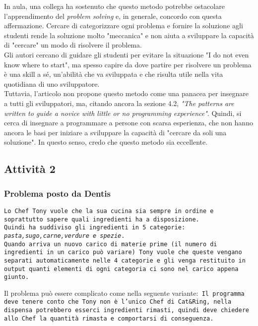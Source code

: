 \documentclass[a4paper]{article}
\begin{document}
In aula, una collega ha sostenuto che questo metodo potrebbe ostacolare l'apprendimento del \textit{problem solving} e, in generale, concordo con questa affermazione.
Cercare di categorizzare ogni problema e fornire la soluzione agli studenti rende la soluzione molto "meccanica" e non aiuta a sviluppare la capacità di "cercare" un modo di risolvere il problema.\\
Gli autori cercano di guidare gli studenti per evitare la situazione "I do not even know where to start", ma spesso capire da dove partire per risolvere un problema è una skill a sé, un'abilità che va sviluppata e che risulta utile nella vita quotidiana di uno sviluppatore.\\

Tuttavia, l'articolo non propone questo metodo come una panacea per insegnare a tutti gli sviluppatori, ma, citando ancora la sezione 4.2, \textit{"The patterns are written to guide a novice with little or no programming experience"}.
Quindi, si cerca di insegnare a programmare a persone con scarsa esperienza, che non hanno ancora le basi per iniziare a sviluppare la capacità di "cercare da soli una soluzione". In questo senso, credo che questo metodo sia eccellente.

\subsection{Attività 2}
\subsubsection{Problema posto da Dentis}
\texttt{Lo Chef Tony vuole che la sua cucina sia sempre in ordine e soprattutto sapere quali ingredienti ha a disposizione.\\Quindi ha suddiviso gli ingredienti in 5 categorie: \textit{pasta,sugo,carne,verdure e spezie}.\\ Quando arriva un nuovo carico di materie prime (il numero di ingredienti in un carico può variare) Tony vuole che queste vengano separati automaticamente nelle 4 categorie e gli venga restituito in output quanti elementi di ogni categoria ci sono nel carico appena giunto.}

Il problema può essere complicato come nella seguente variante:\texttt{ Il programma deve tenere conto che Tony non è l'unico Chef di Cat\&Ring, nella dispensa potrebbero esserci ingredienti rimasti, quindi deve chiedere allo Chef la quantità rimasta e comportarsi di conseguenza.}
\end{document}
